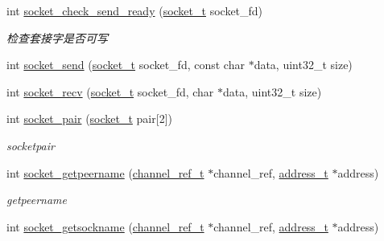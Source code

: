 \begin{DoxyCompactItemize}
\item 
int \hyperlink{a00082_a8afd26cc26824e35f1ec942d2c367c2b_a8afd26cc26824e35f1ec942d2c367c2b}{socket\+\_\+check\+\_\+send\+\_\+ready} (\hyperlink{a00051_a0d9e0afbf02fb6ed6c5b1415dce51b05_a0d9e0afbf02fb6ed6c5b1415dce51b05}{socket\+\_\+t} socket\+\_\+fd)
\begin{DoxyCompactList}\small\item\em 检查套接字是否可写 \end{DoxyCompactList}\item 
int \hyperlink{a00082_a1acbefba637d7c0c3fd77355f84d4c22_a1acbefba637d7c0c3fd77355f84d4c22}{socket\+\_\+send} (\hyperlink{a00051_a0d9e0afbf02fb6ed6c5b1415dce51b05_a0d9e0afbf02fb6ed6c5b1415dce51b05}{socket\+\_\+t} socket\+\_\+fd, const char $\ast$data, uint32\+\_\+t size)
\item 
int \hyperlink{a00082_a8a4b901f1586de59d1d0a88d3326c934_a8a4b901f1586de59d1d0a88d3326c934}{socket\+\_\+recv} (\hyperlink{a00051_a0d9e0afbf02fb6ed6c5b1415dce51b05_a0d9e0afbf02fb6ed6c5b1415dce51b05}{socket\+\_\+t} socket\+\_\+fd, char $\ast$data, uint32\+\_\+t size)
\item 
int \hyperlink{a00082_a64d681185ca861b010c81db7479e9e08_a64d681185ca861b010c81db7479e9e08}{socket\+\_\+pair} (\hyperlink{a00051_a0d9e0afbf02fb6ed6c5b1415dce51b05_a0d9e0afbf02fb6ed6c5b1415dce51b05}{socket\+\_\+t} pair\mbox{[}2\mbox{]})
\begin{DoxyCompactList}\small\item\em socketpair \end{DoxyCompactList}\item 
int \hyperlink{a00082_af9dec30d9e18787252fecc0de537843f_af9dec30d9e18787252fecc0de537843f}{socket\+\_\+getpeername} (\hyperlink{a00051_a151271c9d188ef28d4d24bb81dcc1263_a151271c9d188ef28d4d24bb81dcc1263}{channel\+\_\+ref\+\_\+t} $\ast$channel\+\_\+ref, \hyperlink{a00051_a7a6e75b85c8b441f843bd40004a7d9d5_a7a6e75b85c8b441f843bd40004a7d9d5}{address\+\_\+t} $\ast$address)
\begin{DoxyCompactList}\small\item\em getpeername \end{DoxyCompactList}\item 
int \hyperlink{a00082_ad427473485df55e150741186f3ef2879_ad427473485df55e150741186f3ef2879}{socket\+\_\+getsockname} (\hyperlink{a00051_a151271c9d188ef28d4d24bb81dcc1263_a151271c9d188ef28d4d24bb81dcc1263}{channel\+\_\+ref\+\_\+t} $\ast$channel\+\_\+ref, \hyperlink{a00051_a7a6e75b85c8b441f843bd40004a7d9d5_a7a6e75b85c8b441f843bd40004a7d9d5}{address\+\_\+t} $\ast$address)

\end{DoxyCompactItemize}
